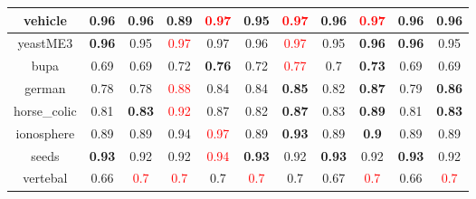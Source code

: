 \documentclass{article}%
\begin{document}
\begin{tabular}{c|cccccccccc}
\hline%
vehicle&0.96&0.96&0.89&\textcolor{red}{ 
0.97
}&0.95&\textcolor{red}{ 
0.97
}&0.96&\textcolor{red}{ 
0.97
}&0.96&0.96\\%
\hline%
yeastME3&\textbf{0.96}&0.95&\textcolor{red}{ 
0.97
}&0.97&0.96&\textcolor{red}{ 
0.97
}&0.95&\textbf{0.96}&\textbf{0.96}&0.95\\%
\hline%
bupa&0.69&0.69&0.72&\textbf{0.76}&0.72&\textcolor{red}{ 
0.77
}&0.7&\textbf{0.73}&0.69&0.69\\%
\hline%
german&0.78&0.78&\textcolor{red}{ 
0.88
}&0.84&0.84&\textbf{0.85}&0.82&\textbf{0.87}&0.79&\textbf{0.86}\\%
\hline%
horse\_colic&0.81&\textbf{0.83}&\textcolor{red}{ 
0.92
}&0.87&0.82&\textbf{0.87}&0.83&\textbf{0.89}&0.81&\textbf{0.83}\\%
\hline%
ionosphere&0.89&0.89&0.94&\textcolor{red}{ 
0.97
}&0.89&\textbf{0.93}&0.89&\textbf{0.9}&0.89&0.89\\%
\hline%
seeds&\textbf{0.93}&0.92&0.92&\textcolor{red}{ 
0.94
}&\textbf{0.93}&0.92&\textbf{0.93}&0.92&\textbf{0.93}&0.92\\%
\hline%
vertebal&0.66&\textcolor{red}{ 
0.7
}&\textcolor{red}{ 
0.7
}&0.7&\textcolor{red}{ 
0.7
}&0.7&0.67&\textcolor{red}{ 
0.7
}&0.66&\textcolor{red}{ 
0.7
}\\%
\hline%
\end{tabular}

%
\end{document}
